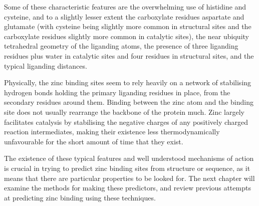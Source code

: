Some of these characteristic features are the overwhelming use of histidine and cysteine, and to a slightly lesser extent the carboxylate residues aspartate and glutamate (with cysteine being slightly more common in structural sites and the carboxylate residues slightly more common in catalytic sites), the near ubiquity tetrahedral geometry of the liganding atoms, the presence of three liganding residues plus water in catalytic sites and four residues in structural sites, and the typical liganding distances.

Physically, the zinc binding sites seem to rely heavily on a network of stabilising hydrogen bonds holding the primary liganding residues in place, from the secondary residues around them. Binding between the zinc atom and the binding site does not usually rearrange the backbone of the protein much. Zinc largely facilitates catalysis by stabilising the negative charges of any positively charged reaction intermediates, making their existence less thermodynamically unfavourable for the short amount of time that they exist.

The existence of these typical features and well understood mechanisms of action is crucial in trying to predict zinc binding sites from structure or sequence, as it means that there are particular properties to be looked for. The next chapter will examine the methods for making these predictors, and review previous attempts at predicting zinc binding using these techniques.


